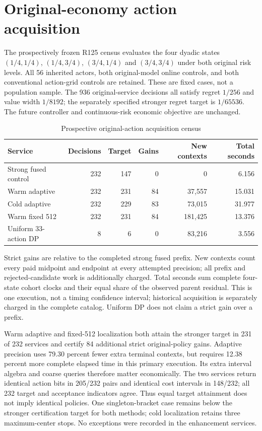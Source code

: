 \section{Original-economy action acquisition}
\label{sec:results125}
The prospectively frozen R125 census evaluates the four dyadic states $(1/4,1/4)$, $(1/4,3/4)$, $(3/4,1/4)$ and $(3/4,3/4)$ under both original risk levels. All 56 inherited actors, both original-model online controls, and both conventional action-grid controls are retained. These are fixed cases, not a population sample. The 936 original-service decisions all satisfy regret $1/256$ and value width $1/8192$; the separately specified stronger regret target is $1/65536$. The future controller and continuous-risk economic objective are unchanged.
\begin{table}[t]
\centering\small
\caption{Prospective original-action acquisition census}
\label{tab:acquisition125}
\begin{tabular}{lrrrrr}
\hline
Service & Decisions & Target & Gains & New contexts & Total seconds \\
\hline
Strong fused control & 232 & 147 & 0 & 0 & 6.156 \\
Warm adaptive & 232 & 231 & 84 & 37,557 & 15.031 \\
Cold adaptive & 232 & 229 & 83 & 73,015 & 31.977 \\
Warm fixed 512 & 232 & 231 & 84 & 181,425 & 13.376 \\
Uniform 33-action DP & 8 & 6 & 0 & 83,216 & 3.556 \\
\hline
\end{tabular}
\par\smallskip\parbox{0.96\textwidth}{\footnotesize Strict gains are relative to the completed strong fused prefix. New contexts count every paid midpoint and endpoint at every attempted precision; all prefix and rejected-candidate work is additionally charged. Total seconds sum complete four-state cohort clocks and their equal share of the observed parent residual. This is one execution, not a timing confidence interval; historical acquisition is separately charged in the complete catalog. Uniform DP does not claim a strict gain over a prefix.}
\end{table}
Warm adaptive and fixed-512 localization both attain the stronger target in 231 of 232 services and certify 84 additional strict original-policy gains. Adaptive precision uses 79.30 percent fewer extra terminal contexts, but requires 12.38 percent more complete elapsed time in this primary execution. Its extra interval algebra and coarse queries therefore matter economically. The two services return identical action bits in 205/232 pairs and identical cost intervals in 148/232; all 232 target and acceptance indicators agree. Thus equal target attainment does not imply identical policies. One singleton-bracket case remains below the stronger certification target for both methods; cold localization retains three maximum-center stops. No exceptions were recorded in the enhancement services.
